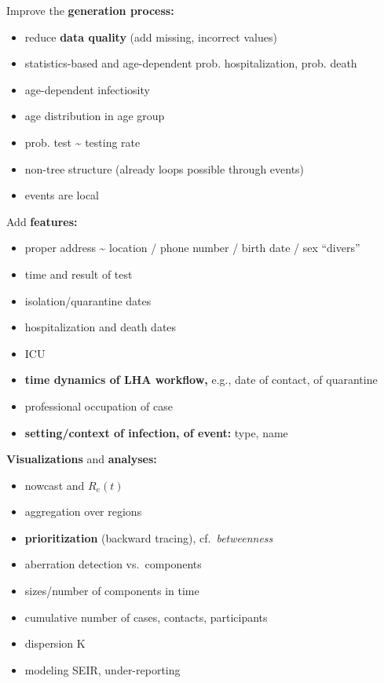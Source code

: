 \documentclass[
  8pt,
  ignorenonframetext,
]{beamer}
\providecommand{\tightlist}{%
  \setlength{\itemsep}{0pt}\setlength{\parskip}{0pt}}
\begin{document}
\begin{frame}
Improve the \textbf{generation process:}

\begin{itemize}
\tightlist
\item
  reduce \textbf{data quality} (add missing, incorrect values)
\item
  statistics-based and age-dependent prob. hospitalization, prob. death
\item
  age-dependent infectiosity
\item
  age distribution in age group
\item
  prob. test \textasciitilde{} testing rate
\item
  non-tree structure (already loops possible through events)
\item
  events are local
\end{itemize}
\end{frame}

\begin{frame}
Add \textbf{features:}

\begin{itemize}
\tightlist
\item
  proper address \textasciitilde{} location / phone number / birth date
  / sex ``divers''
\item
  time and result of test
\item
  isolation/quarantine dates
\item
  hospitalization and death dates
\item
  ICU
\item
  \textbf{time dynamics of LHA workflow,} e.g., date of contact, of
  quarantine
\item
  professional occupation of case
\item
  \textbf{setting/context of infection, of event:} type, name
\end{itemize}
\end{frame}

\begin{frame}
\textbf{Visualizations} and \textbf{analyses:}

\begin{itemize}
\tightlist
\item
  nowcast and \(R_e(t)\)
\item
  aggregation over regions
\item
  \textbf{prioritization} (backward tracing), cf.~\emph{betweenness}
\item
  aberration detection vs.~components
\item
  sizes/number of components in time
\item
  cumulative number of cases, contacts, participants
\item
  dispersion K
\item
  modeling SEIR, under-reporting
\end{itemize}
\end{frame}
\end{document}
